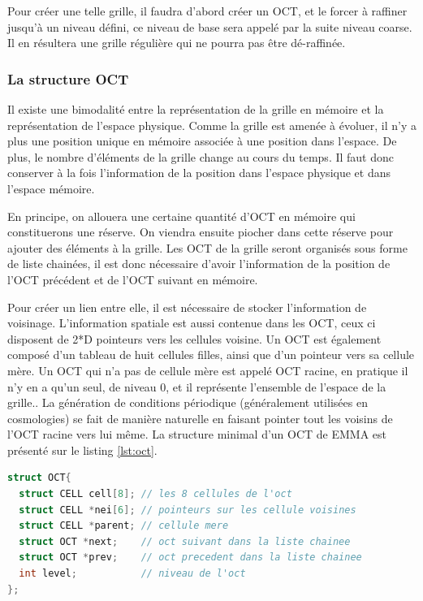Pour créer une telle grille, il faudra d'abord créer un OCT, et le forcer à raffiner jusqu'à un niveau défini, ce niveau de base sera appelé par la suite niveau coarse.
Il en résultera une grille régulière qui ne pourra pas être dé-raffinée.

\subsubsection{La structure OCT}

Il existe une bimodalité entre la représentation de la grille en mémoire et la représentation de l'espace physique.
Comme la grille est amenée à évoluer, il n'y a plus une position unique en mémoire associée à une position dans l'espace.
De plus, le nombre d'éléments de la grille change au cours du temps.
Il faut donc conserver à la fois l'information de la position dans l'espace physique et dans l'espace mémoire.

En principe, on allouera une certaine quantité d'OCT en mémoire qui constituerons une réserve.
On viendra ensuite piocher dans cette réserve pour ajouter des éléments à la grille.
Les OCT de la grille seront organisés sous forme de liste chainées, il est donc nécessaire d'avoir l'information de la position de l'OCT précédent et de l'OCT suivant en mémoire.

Pour créer un lien entre elle, il est nécessaire de stocker l'information de voisinage.
L'information spatiale est aussi contenue dans les OCT, ceux ci disposent de  2*D pointeurs vers les cellules voisine.
Un OCT est également composé d'un tableau de huit cellules filles, ainsi que d'un pointeur vers sa cellule mère.
Un OCT qui n'a pas de cellule mère est appelé OCT racine, en pratique il n'y en a qu'un seul, de niveau 0, et il représente l'ensemble de l'espace de la grille..
La génération de conditions périodique (généralement utilisées en cosmologies) se fait de manière naturelle en faisant pointer tout les voisins de l'OCT racine vers lui même.
La structure minimal d'un OCT de EMMA est présenté sur le listing \ref{lst:oct}.

\begin{lstlisting}[float=bth,language=C,frame=tb,caption={La structure OCT de EMMA},label=lst:oct]
struct OCT{
  struct CELL cell[8]; // les 8 cellules de l'oct
  struct CELL *nei[6]; // pointeurs sur les cellule voisines
  struct CELL *parent; // cellule mere
  struct OCT *next;    // oct suivant dans la liste chainee
  struct OCT *prev;    // oct precedent dans la liste chainee
  int level;           // niveau de l'oct
};
\end{lstlisting}

